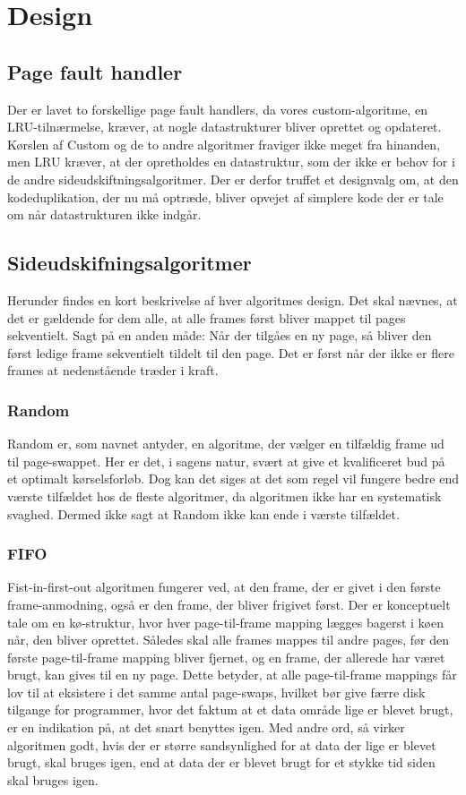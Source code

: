 \section{Design}
\label{sec:design}

\subsection{Page fault handler}
Der er lavet to forskellige page fault handlers, da vores custom-algoritme, en LRU-tilnærmelse, kræver, at nogle datastrukturer bliver oprettet og opdateret. Kørslen af Custom og de to andre algoritmer fraviger ikke meget fra hinanden, men LRU kræver, at der opretholdes en datastruktur, som der ikke er behov for i de andre sideudskiftningsalgoritmer. Der er derfor truffet et designvalg om, at den kodeduplikation, der nu må optræde, bliver opvejet af simplere kode der er tale om når datastrukturen ikke indgår.  

\subsection{Sideudskifningsalgoritmer}
Herunder findes en kort beskrivelse af hver algoritmes design. Det skal nævnes, at det er gældende for dem alle, at alle frames først bliver mappet til pages sekventielt. Sagt på en anden måde: Når der tilgåes en ny page, så bliver den først ledige frame sekventielt tildelt til den page. Det er først når der ikke er flere frames at nedenstående træder i kraft.

	\subsubsection{Random}
	Random er, som navnet antyder, en algoritme, der vælger en tilfældig frame ud til page-swappet. Her er det, i sagens natur, svært at give et kvalificeret bud på et optimalt kørselsforløb. Dog kan det siges at det som regel vil fungere bedre end værste tilfældet hos de fleste algoritmer, da algoritmen ikke har en systematisk svaghed. Dermed ikke sagt at Random ikke kan ende i værste tilfældet. 
	
	\subsubsection{FIFO}
	Fist-in-first-out algoritmen fungerer ved, at den frame, der er givet i den første frame-anmodning, også er den frame, der bliver frigivet først. Der er konceptuelt tale om en kø-struktur, hvor hver page-til-frame mapping lægges bagerst i køen når, den bliver oprettet. Således skal alle frames mappes til andre pages, før den første page-til-frame mapping bliver fjernet, og en frame, der allerede har været brugt, kan gives til en ny page. Dette betyder, at alle page-til-frame mappings får lov til at eksistere i det samme antal page-swaps, hvilket bør give færre disk tilgange for programmer, hvor det faktum at et data område lige er blevet brugt, er en indikation på, at det snart benyttes igen. Med andre ord, så virker algoritmen godt, hvis der er større sandsynlighed for at data der lige er blevet brugt, skal bruges igen, end at data der er blevet brugt for et stykke tid siden skal bruges igen.

